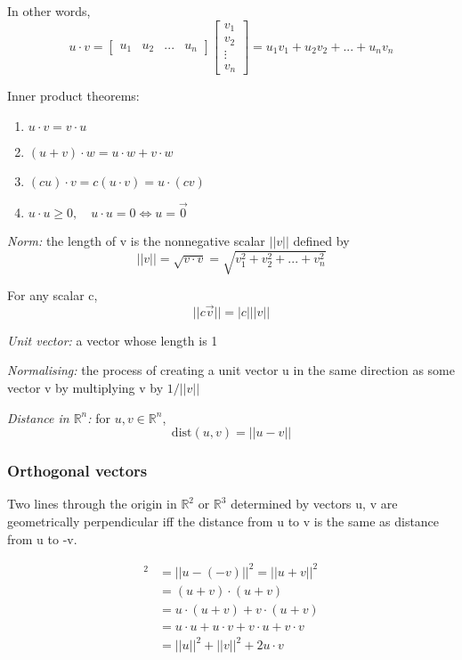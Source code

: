 \documentclass[12pt]{article} %
\newcommand{\R}{\mathbb{R}}
\begin{document}
In other words,
$$u \cdot v = \begin{bmatrix}
	u_1 & u_2 & ... & u_n
\end{bmatrix} \begin{bmatrix}
	v_1\\
	v_2\\
	\vdots\\
	v_n
\end{bmatrix} = u_1 v_1 + u_2 v_2 + ... + u_n v_n$$

Inner product theorems:
\begin{enumerate}
	\item $u \cdot v = v \cdot u$
	\item $(u + v) \cdot w = u \cdot w + v \cdot w$
	\item $(cu)\cdot v = c(u\cdot v) = u\cdot (cv)$
	\item $u \cdot u \geq 0, \quad u \cdot u = 0 \iff u = \vec{0}$ 
\end{enumerate}

\emph{Norm:} the length of v is the nonnegative scalar $||v||$ defined by 
$$||v|| = \sqrt{v \cdot v} = \sqrt{v_1^2 + v_2^2 + ... + v_n^2}$$

For any scalar c,
$$||c \vec{v}|| = |c| ||v||$$

\emph{Unit vector:} a vector whose length is 1


\emph{Normalising:} the process of creating a unit vector u in the same direction as some vector v by multiplying v by $1 / ||v||$ 

\emph{Distance in $\R^n$:} for $u, v \in \R^n$, $$\text{dist}(u, v) = ||u - v||$$

\subsubsection{Orthogonal vectors}
Two lines through the origin in $\R^2$ or $\R^3$ determined by vectors u, v are geometrically perpendicular iff the distance from u to v is the same as distance from u to -v. 

\begin{align*}
	[\text{dist}(u, -v)]^2 &= ||u - (-v)||^2 = ||u + v||^2\\
	&= (u + v) \cdot (u + v)\\
	&= u \cdot (u + v) + v\cdot (u + v)\\
	&= u \cdot u + u\cdot v + v\cdot u + v\cdot v\\
	&= ||u||^2 + ||v||^2 + 2u \cdot v
\end{align*}
\end{document}
